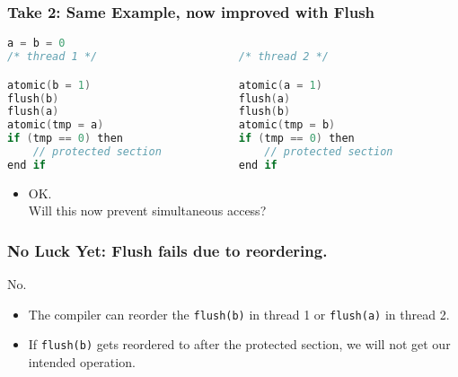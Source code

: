 \begin{frame}[fragile]
  \frametitle{Take 2: Same Example, now improved with Flush}

  \begin{lstlisting}[language=C,morekeywords={foreach,pragma,omp,parallel,single,nowait,task,untied,barrier,taskyield,mergeable,final,taskwait,critical}]
                    a = b = 0
/* thread 1 */                      /* thread 2 */

atomic(b = 1)                       atomic(a = 1)
flush(b)                            flush(a)
flush(a)                            flush(b)
atomic(tmp = a)                     atomic(tmp = b)
if (tmp == 0) then                  if (tmp == 0) then
    // protected section                // protected section
end if                              end if
  \end{lstlisting}

\Large
  \begin{changemargin}{1cm}
  \begin{itemize}
    \item OK. \\ Will this now prevent simultaneous access?
  \end{itemize}
  \end{changemargin}
\end{frame}

\begin{frame}[fragile]
  \frametitle{No Luck Yet: Flush fails due to reordering.}

  

  \begin{center}
    \alert{\LARGE No.}
  \end{center}

\Large
  \begin{changemargin}{1cm}
  \begin{itemize}
    \item The compiler can reorder the {\tt flush(b)} in thread 1 or
      {\tt flush(a)} in thread 2.

    \item If {\tt flush(b)} gets reordered to after the protected
      section, we will not get our intended operation.
  \end{itemize}
  \end{changemargin}
  
\end{frame}

